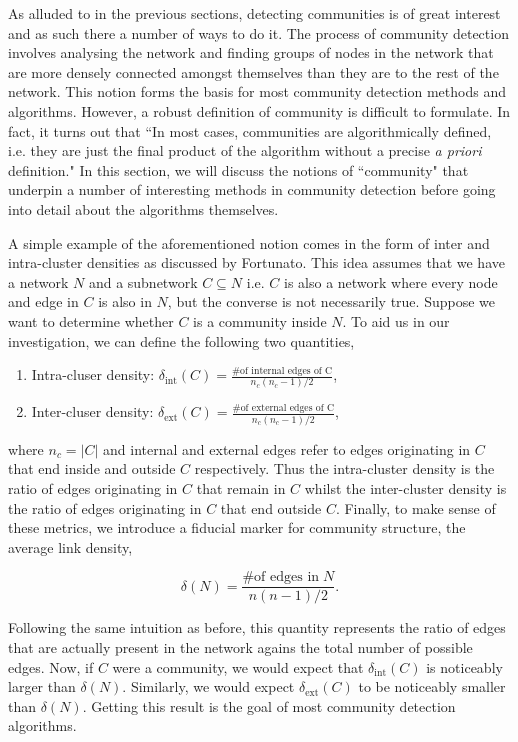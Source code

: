 As alluded to in the previous sections, detecting communities is of great interest and as such there a number of ways to do it. The process of community detection involves analysing the network and finding groups of nodes in the network that are more densely connected amongst themselves than they are to the rest of the network. This notion forms the basis for most community detection methods and algorithms. However, a robust definition of community is difficult to formulate. In fact, it turns out that ``In most cases, communities are algorithmically defined, i.e. they are just the final product of the algorithm without a precise \emph{a priori} definition."\cite[84]{fortunato} In this section, we will discuss the notions of ``community" that underpin a number of interesting methods in community detection before going into detail about the algorithms themselves.

A simple example of the aforementioned notion comes in the form of inter and intra-cluster densities as discussed by Fortunato\cite[84]{fortunato}. This idea assumes that we have a network $N$ and a subnetwork $C \subseteq N$ i.e. $C$ is also a network where every node and edge in $C$ is also in $N$, but the converse is not necessarily true. Suppose we want to determine whether $C$ is a community inside $N$. To aid us in our investigation, we can define the following two quantities,

\begin{enumerate}
    \item Intra-cluser density: $\delta_{\text{int}}(C) = \frac{\text{\# of internal edges of C}}{n_c(n_c - 1)/2} $,
    \item Inter-cluser density: $\delta_{\text{ext}}(C) = \frac{\text{\# of external edges of C}}{n_c(n_c - 1)/2} $,
\end{enumerate}

where $n_c = |C|$ and internal and external edges refer to edges originating in $C$ that end inside and outside $C$ respectively. Thus the intra-cluster density is the ratio of edges originating in $C$ that remain in $C$ whilst the inter-cluster density is the ratio of edges originating in $C$ that end outside $C$. Finally, to make sense of these metrics, we introduce a fiducial marker for community structure, the average link density,

$$ \delta(N) = \frac{\text{\# of edges in}\; N}{n(n-1)/2}. $$

Following the same intuition as before, this quantity represents the ratio of edges that are actually present in the network agains the total number of possible edges. Now, if $C$ were a community, we would expect that $\delta_{\text{int}}(C)$ is noticeably larger than $\delta(N)$. Similarly, we would expect $\delta_{\text{ext}}(C)$ to be noticeably smaller than $\delta(N)$. Getting this result is the goal of most community detection algorithms.

